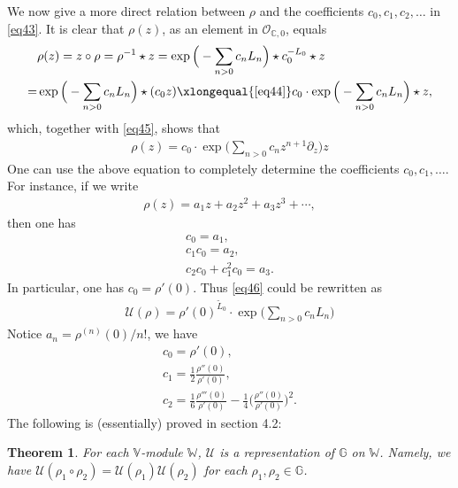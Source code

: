 \documentclass[12pt,a4paper,notitlepage]{report}
\theoremstyle{definition}
\theoremstyle{plain}
\newtheorem{thm}[df]{Theorem}
\newcommand{\mc}{\mathcal}
\newcommand{\wtd}{\widetilde}
\newcommand{\scr}{\mathscr}
\newcommand{\Vbb}{\mathbb V}
\newcommand{\Wbb}{\mathbb W}
\newcommand{\Gbb}{\mathbb G}
\newcommand{\Cbb}{\mathbb C}
\numberwithin{equation}{section}
\begin{document}
We now give a more direct relation between $\rho$ and the coefficients $c_0,c_1,c_2,\dots$ in \eqref{eq43}. It is clear that $\rho(z)$, as an element in $\scr O_{\Cbb,0}$, equals
\begin{align*}
&\rho(z)=z\circ\rho=\rho^{-1}\star z=\exp\Big(-\sum_{n>0}c_n L_n\Big)\star c_0^{-L_0}\star z\\
=&\exp\Big(-\sum_{n>0}c_n L_n\Big)\star (c_0z) \xlongequal{\eqref{eq44}} c_0\cdot \exp\Big(-\sum_{n>0}c_n L_n\Big)\star z,
\end{align*}
which, together with \eqref{eq45}, shows that
\begin{align}
\boxed{\rho(z)=c_0\cdot \exp\Big(\sum_{n>0}c_n z^{n+1}\partial_z \Big) z}
\end{align}
One can use the above equation to completely determine the coefficients $c_0,c_1,\dots$. For instance, if we write
\begin{align}
\rho(z)=a_1z+a_2z^2+a_3z^3+\cdots,\label{eq48}
\end{align}
then one has
\begin{gather}
c_0=a_1,\nonumber\\
c_1c_0=a_2,\nonumber\\
c_2c_0+c_1^2c_0=a_3.\nonumber
\end{gather}
In particular, one has $c_0=\rho'(0)$. Thus \eqref{eq46} could be rewritten as
\begin{align}
\boxed{\mc U(\rho)=\rho'(0)^{\wtd L_0}\cdot \exp\Big(\sum_{n>0}c_n L_n\Big)}\label{eq47}
\end{align}
Notice $a_n=\rho^{(n)}(0)/n!$, we have
\begin{gather}
c_0=\rho'(0),\nonumber\\
c_1=\frac 12\frac{\rho''(0)}{\rho'(0)},\nonumber\\
c_2=\frac 16 \frac{\rho'''(0)}{\rho'(0)}-\frac 14\Big(\frac{\rho''(0)}{\rho'(0)}\Big)^2.\label{eq165}
\end{gather}
The following is (essentially) proved in \cite{Hua97} section 4.2:
\begin{thm}
For each $\Vbb$-module $\Wbb$, $\mc U$ is a representation of $\Gbb$ on $\Wbb$. Namely, we have $\mc U(\rho_1\circ\rho_2)=\mc U(\rho_1)\mc U(\rho_2)$ for each $\rho_1,\rho_2\in\Gbb$.
\end{thm}
\end{document}
